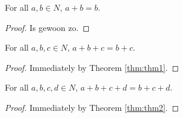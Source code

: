 %

\begin{theorem}
    \label{thm:thm1}
    For all $a,b \in N$, $a + b = b$.
\end{theorem}

\begin{proof} Is gewoon zo.
\end{proof}

\begin{theorem}
    \leanok
    \label{thm:thm2}
    For all $a,b,c \in N$, $a + b + c = b + c$.
\end{theorem}

\begin{proof}  \leanok Immediately by Theorem \ref{thm:thm1}.
\end{proof}

\begin{theorem}
    \leanok
    \label{thm:thm3}
    For all $a, b, c, d \in N$, $a + b + c + d = b + c + d$.
\end{theorem}

\begin{proof} \leanok {} Immediately by Theorem \ref{thm:thm2}.
\end{proof}